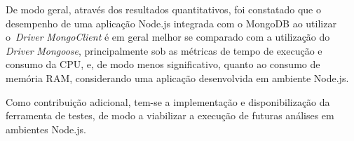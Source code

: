 \documentclass{svproc}
\begin{document}
De modo geral, através dos resultados quantitativos, foi constatado que o desempenho de uma aplicação Node.js integrada com o MongoDB ao utilizar o~\emph{Driver} \emph{MongoClient} é em geral melhor se comparado com a utilização do \emph{Driver} \emph{Mongoose}, principalmente sob as métricas de tempo de execução e consumo da CPU, e, de modo menos significativo, quanto ao consumo de memória RAM, considerando uma aplicação desenvolvida em ambiente Node.js.

Como contribuição adicional, tem-se a implementação e disponibilização da ferramenta de testes, de modo a viabilizar a execução de futuras análises em ambientes Node.js.

%
%
%
%




\end{document}
